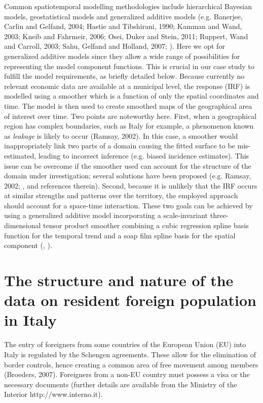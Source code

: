 Common spatiotemporal modelling methodologies include hierarchical Bayesian models, geostatistical models and generalized additive models (e.g. Banerjee, Carlin and Gelfand, 2004; Hastie and Tibshirani, 1990; Kamman and Wand, 2003; Kneib and Fahrmeir, 2006; Osei, Duker and Stein, 2011; Ruppert, Wand and Carroll, 2003; Sahu, Gelfand and Holland, 2007; \cite{simonbook}). Here we opt for generalized additive models since they allow a wide range of possibilities for representing the model component functions. This is crucial in our case study to fulfill the model requirements, as briefly detailed below. Because currently no relevant economic data are available at a municipal level, the response (IRF) is modelled using a smoother which is a function of only the spatial coordinates and time. The model is then used to create smoothed maps of the geographical area of interest over time. Two points are noteworthy here. First, when a geographical region has complex boundaries, such as Italy for example, a phenomenon known as \textit{leakage} is likely to occur (Ramsay, 2002). In this case, a smoother would inappropriately link two parts of a domain causing the fitted surface to be mis-estimated, leading to incorrect inference (e.g. biased incidence estimates). This issue can be overcome if the smoother used can account for the structure of the domain under investigation; several solutions have been proposed (e.g. Ramsay, 2002; \cite{soap}, and references therein). Second, because it is unlikely that the IRF occurs at similar strengths and patterns over the territory, the employed approach should account for a space-time interaction. These two goals can be achieved by using a generalized additive model incorporating a scale-invariant three-dimensional tensor product smoother combining a cubic regression spline basis function for the temporal trend and a soap film spline basis for the spatial component (\cite{simonbook}, \cite{soap}).


\section{The structure and nature of the data on resident foreign population in Italy\label{SDC}}

The entry of foreigners from some countries of the European Union (EU) into Italy is regulated by the Schengen agreements. These allow for the elimination of border controls, hence creating a common area of free movement among members (Broeders, 2007). Foreigners from a non-EU country must possess a visa or the necessary documents (further details are available from the Ministry of the Interior http://www.interno.it). 
 
